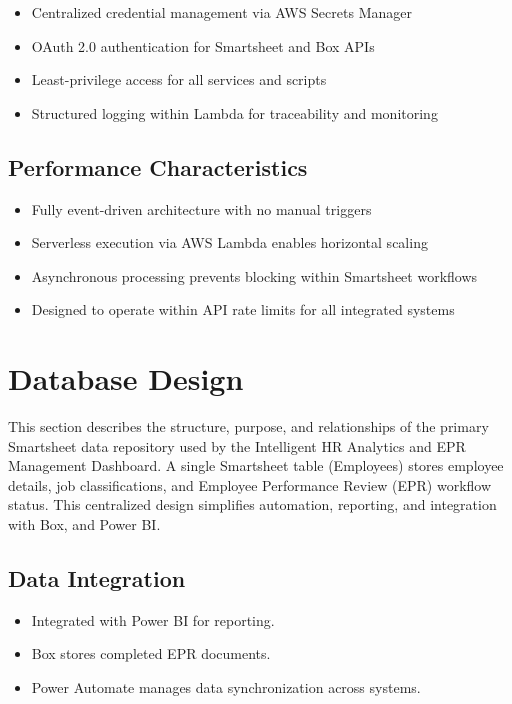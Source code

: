 \documentclass[12pt]{article}
\def\&{ and }%
\begin{document}
\begin{itemize}
    \item Centralized credential management via AWS Secrets Manager
    \item OAuth 2.0 authentication for Smartsheet and Box APIs
    \item Least-privilege access for all services and scripts
    \item Structured logging within Lambda for traceability and monitoring
\end{itemize}

\subsection{Performance Characteristics}

\begin{itemize}
    \item Fully event-driven architecture with no manual triggers
    \item Serverless execution via AWS Lambda enables horizontal scaling
    \item Asynchronous processing prevents blocking within Smartsheet workflows
    \item Designed to operate within API rate limits for all integrated systems
\end{itemize}

\section{Database Design}

This section describes the structure, purpose, and relationships of the primary Smartsheet data repository used by the Intelligent HR Analytics \& EPR Management Dashboard.  
A single Smartsheet table (Employees) stores employee details, job classifications, and Employee Performance Review (EPR) workflow status. This centralized design simplifies automation, reporting, and integration with Box, and Power BI.

\subsection{Data Integration}
\begin{itemize}[nosep]
  \item Integrated with Power BI for reporting.
  \item Box stores completed EPR documents.
  \item Power Automate manages data synchronization across systems.
\end{itemize}
\end{document}
